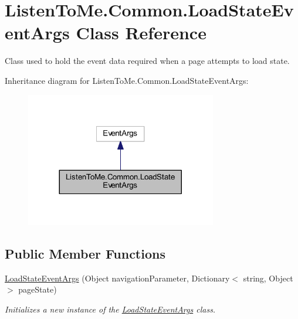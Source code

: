 \hypertarget{class_listen_to_me_1_1_common_1_1_load_state_event_args}{}\section{Listen\+To\+Me.\+Common.\+Load\+State\+Event\+Args Class Reference}
\label{class_listen_to_me_1_1_common_1_1_load_state_event_args}


Class used to hold the event data required when a page attempts to load state.  




Inheritance diagram for Listen\+To\+Me.\+Common.\+Load\+State\+Event\+Args\+:\nopagebreak
\begin{figure}[H]
\begin{center}
\leavevmode
\includegraphics[width=236pt]{class_listen_to_me_1_1_common_1_1_load_state_event_args__inherit__graph}
\end{center}
\end{figure}
\subsection*{Public Member Functions}
\begin{DoxyCompactItemize}
\item 
\hyperlink{class_listen_to_me_1_1_common_1_1_load_state_event_args_a2552cf041b47950fb1ea6729fb6f89f4}{Load\+State\+Event\+Args} (Object navigation\+Parameter, Dictionary$<$ string, Object $>$ page\+State)
\begin{DoxyCompactList}\small\item\em Initializes a new instance of the \hyperlink{class_listen_to_me_1_1_common_1_1_load_state_event_args}{Load\+State\+Event\+Args} class. \end{DoxyCompactList}\end{DoxyCompactItemize}
